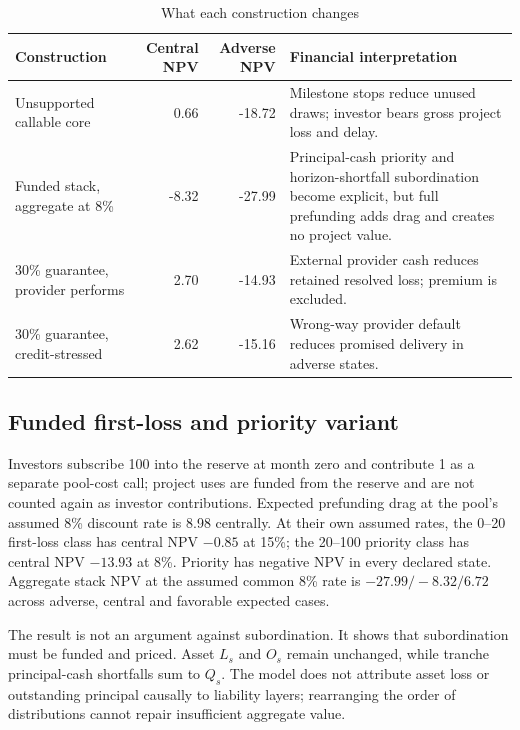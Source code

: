 \documentclass[11pt,a4paper]{article}
\begin{document}
\begin{table}[htbp]
\centering
\caption{What each construction changes}
\label{tab:variants}
\small
\begin{tabularx}{\textwidth}{@{}P{0.25\textwidth}R R Y@{}}
\toprule
\textbf{Construction} & \textbf{Central NPV} & \textbf{Adverse NPV} & \textbf{Financial interpretation} \\
\midrule
Unsupported callable core & 0.66 & -18.72 & Milestone stops reduce unused draws; investor bears gross project loss and delay. \\
Funded stack, aggregate at 8\% & -8.32 & -27.99 & Principal-cash priority and horizon-shortfall subordination become explicit, but full prefunding adds drag and creates no project value. \\
30\% guarantee, provider performs & 2.70 & -14.93 & External provider cash reduces retained resolved loss; premium is excluded. \\
30\% guarantee, credit-stressed & 2.62 & -15.16 & Wrong-way provider default reduces promised delivery in adverse states. \\
\bottomrule
\end{tabularx}
\end{table}

\subsection{Funded first-loss and priority variant}

Investors subscribe 100 into the reserve at month zero and contribute 1 as a separate pool-cost call; project uses are funded from the reserve and are not counted again as investor contributions. Expected prefunding drag at the pool's assumed 8\% discount rate is 8.98 centrally. At their own assumed rates, the 0--20 first-loss class has central NPV \(-0.85\) at 15\%; the 20--100 priority class has central NPV \(-13.93\) at 8\%. Priority has negative NPV in every declared state. Aggregate stack NPV at the assumed common 8\% rate is \(-27.99/-8.32/6.72\) across adverse, central and favorable expected cases.

The result is not an argument against subordination. It shows that subordination must be funded and priced. Asset \(L_s\) and \(O_s\) remain unchanged, while tranche principal-cash shortfalls sum to \(Q_s\). The model does not attribute asset loss or outstanding principal causally to liability layers; rearranging the order of distributions cannot repair insufficient aggregate value.
\end{document}
